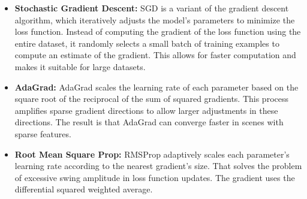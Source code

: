 \documentclass[english,version-2022-01]{uzl-thesis}
\begin{document}
\begin{itemize}
    \begin{itemize}
    \item \textbf{Stochastic Gradient Descent:} SGD is a variant of the gradient descent algorithm, which iteratively adjusts the model's parameters to minimize the loss function. Instead of computing the gradient of the loss function using the entire dataset, it randomly selects a small batch of training examples to compute an estimate of the gradient. This allows for faster computation and makes it suitable for large datasets.\cite{AMARI1993185}
    \item \textbf{AdaGrad:} AdaGrad scales the learning rate of each parameter based on the square root of the reciprocal of the sum of squared gradients. This process amplifies sparse gradient directions to allow larger adjustments in these directions. The result is that AdaGrad can converge faster in scenes with sparse features.\cite{10.5555/3455716.3455935}
    \item \textbf{Root Mean Square Prop:} RMSProp adaptively scales each parameter's learning rate according to the nearest gradient's size. That solves the problem of excessive swing amplitude in loss function updates. The gradient uses the differential squared weighted average\cite{NEURIPS2019_1e8a1942}.
    \end{itemize}
\end{itemize}
\end{document}
